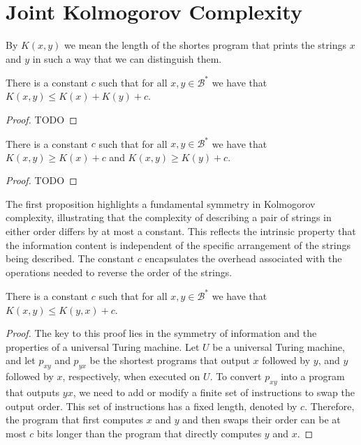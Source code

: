 %
%

\section{Joint Kolmogorov Complexity}

By $K(x, y)$ we mean the length of the shortes program that prints the strings $x$ and $y$ in such a way that we can distinguish them.

\begin{proposition}
\label{prop:additive_kolmogorov}
There is a constant $c$ such that for all $x, y \in\mathcal{B}^{\ast}$ we have that $K(x, y) \leq K(x) + K(y) + c$.
\end{proposition}
\begin{proof}
{\color{red} TODO}
\end{proof}

\begin{proposition}
\label{prop:excess_kolmogorov}
There is a constant $c$ such that for all $x, y \in\mathcal{B}^{\ast}$ we have that $K(x, y) \geq K(x) + c$ and $K(x, y) \geq K(y) + c$.
\end{proposition}
\begin{proof}
{\color{red} TODO}
\end{proof}

The first proposition highlights a fundamental symmetry in Kolmogorov complexity, illustrating that the complexity of describing a pair of strings in either order differs by at most a constant. This reflects the intrinsic property that the information content is independent of the specific arrangement of the strings being described. The constant \(c\) encapsulates the overhead associated with the operations needed to reverse the order of the strings.

\begin{proposition}
\label{prop:kolmogorov_order}
There is a constant $c$ such that for all $x, y \in\mathcal{B}^{\ast}$ we have that $K(x, y) \leq K(y, x) + c$.
\end{proposition}
\begin{proof}
The key to this proof lies in the symmetry of information and the properties of a universal Turing machine. Let $U$ be a universal Turing machine, and let $p_{xy}$ and $p_{yx}$ be the shortest programs that output $x$ followed by $y$, and $y$ followed by $x$, respectively, when executed on $U$. To convert $p_{xy}$ into a program that outputs $yx$, we need to add or modify a finite set of instructions to swap the output order. This set of instructions has a fixed length, denoted by $c$. Therefore, the program that first computes $x$ and $y$ and then swaps their order can be at most $c$ bits longer than the program that directly computes $y$ and $x$.
\end{proof}

